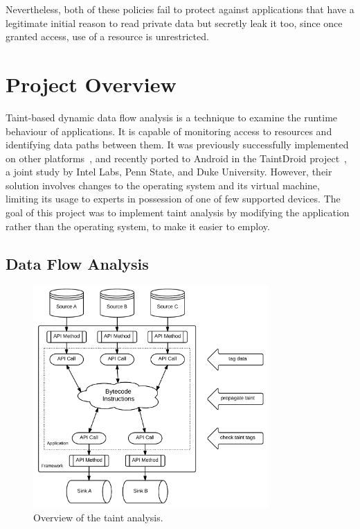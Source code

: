 \documentclass[12pt,twoside,notitlepage]{report}
\begin{document}
Nevertheless, both of these policies fail to protect against applications that have a legitimate initial reason to read private data but secretly leak it too, since once granted access, use of a resource is unrestricted.

\section{Project Overview}

Taint-based dynamic data flow analysis is a technique to examine the runtime behaviour of applications. It is capable of monitoring access to resources and identifying data paths between them. It was previously successfully implemented on other platforms~\cite{Zhu:2011:TPS:1945023.1945039}, and recently ported to Android in the TaintDroid project~\cite{Enck:2010:TIT:1924943.1924971}, a joint study by Intel Labs, Penn State, and Duke University. However, their solution involves changes to the operating system and its virtual machine, limiting its usage to experts in possession of one of few supported devices. The goal of this project was to implement taint analysis by modifying the application rather than the operating system, to make it easier to employ.

\subsection{Data Flow Analysis}

\begin{figure}
	\centerline{	
		\includegraphics[width=0.8\textwidth]{figs/fig_intro_tainting.png}
	}
	\caption{Overview of the taint analysis.}
	\label{fig:Introduction_TaintingOverview}
\end{figure}
\end{document}
